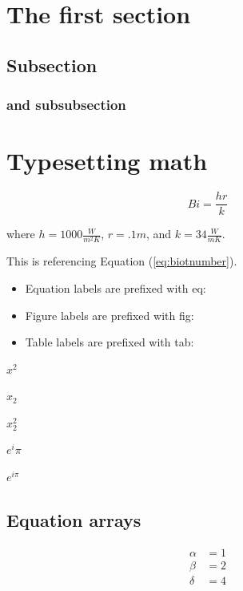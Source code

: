 \documentclass[12pt,a4paper]{article}
\begin{document}
\section{The first section}

  \subsection{Subsection}
  \subsubsection{and subsubsection}

\section{Typesetting math}

  \begin{equation}
    Bi = \frac{hr}{k}
    \label{eq:biotnumber}
  \end{equation}

  where $h = 1000 \frac{W}{m^2K}$, $r = .1m$, and $k = 34 \frac{W}{m
  K}$.
  
  This is referencing Equation (\ref{eq:biotnumber}).
  

  \begin{itemize}
    \item Equation labels are prefixed with eq:
    \item Figure labels are prefixed with fig:
    \item Table labels are prefixed with tab:
  \end{itemize}

  \begin{center}

  $x^2$

  $x_2$

  $x^2_2$

  $e^i \pi$

  $e^{i \pi}$

  \end{center}

  \subsection{Equation arrays}

  \begin{align}
    \alpha &= 1 \\
    \beta &= 2 \\ 
    \delta &= 4 
  \end{align}
\end{document}
